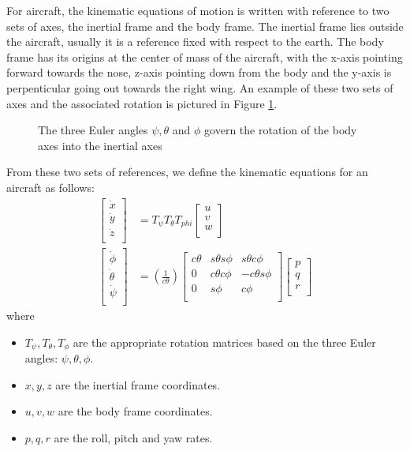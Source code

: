For aircraft, the kinematic equations of motion is written with
reference to two sets of axes, the inertial frame and the body
frame. The inertial frame lies outside the aircraft, usually it is a
reference fixed with respect to the earth. The body frame has its
origins at the center of mass of the aircraft, with the x-axis
pointing forward towards the nose, z-axis pointing down from the body
and the y-axis is perpenticular going out towards the right wing. An
example of these two sets of axes and the associated rotation is
pictured in Figure \ref{fig:euler}.
\begin{figure}[h]
  \caption{The three Euler angles $\psi, \theta$ and $\phi$ govern the
  rotation of the body axes into the inertial axes}
  \label{fig:euler}
\end{figure}
From these two sets of references, we define the kinematic equations
for an aircraft as follows:
\begin{align}
  \begin{bmatrix}
    \dot x \\
    \dot y \\
    \dot z \\
  \end{bmatrix}
  &=
  T_{\psi}T_{\theta}T_{phi}
  \begin{bmatrix}
    u \\
    v \\
    w \\
  \end{bmatrix} \\
  \begin{bmatrix}
    \dot \phi \\
    \dot \theta \\
    \dot \psi \\
  \end{bmatrix}
  &=
  (\frac{1}{c \theta})
  \begin{bmatrix}
    c \theta & s\theta s \phi & s \theta c \phi \\
    0 & c \theta c \phi & -c \theta s \phi \\
    0 & s \phi & c \phi\\
  \end{bmatrix} 
  \begin{bmatrix}
    p \\
    q \\
    r \\
  \end{bmatrix}
\end{align}
where
\begin{itemize}
\item $T_{\psi}, T_{\theta}, T_{\phi}$ are the appropriate rotation
matrices based on the three Euler angles: $\psi, \theta,
\phi$.
\item $x,y,z$ are the inertial frame coordinates.
\item $u,v,w$ are the body frame coordinates.
\item $p,q,r$ are the roll, pitch and yaw rates.
\end{itemize}

